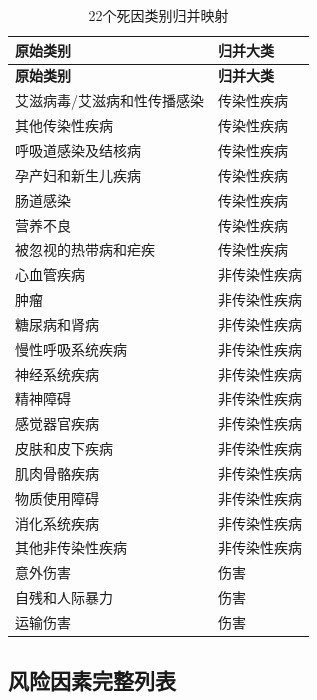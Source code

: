 \documentclass[12pt,a4paper]{ctexart}
\begin{document}
\begin{longtable}{p{8cm}l}
\caption{22个死因类别归并映射} \label{tab:full-cause-map} \\
\toprule
\textbf{原始类别} & \textbf{归并大类} \\
\midrule
\endfirsthead
\toprule
\textbf{原始类别} & \textbf{归并大类} \\
\midrule
\endhead
\midrule
\endfoot
\bottomrule
\endlastfoot
艾滋病毒/艾滋病和性传播感染 & 传染性疾病 \\
其他传染性疾病 & 传染性疾病 \\
呼吸道感染及结核病 & 传染性疾病 \\
孕产妇和新生儿疾病 & 传染性疾病 \\
肠道感染 & 传染性疾病 \\
营养不良 & 传染性疾病 \\
被忽视的热带病和疟疾 & 传染性疾病 \\
心血管疾病 & 非传染性疾病 \\
肿瘤 & 非传染性疾病 \\
糖尿病和肾病 & 非传染性疾病 \\
慢性呼吸系统疾病 & 非传染性疾病 \\
神经系统疾病 & 非传染性疾病 \\
精神障碍 & 非传染性疾病 \\
感觉器官疾病 & 非传染性疾病 \\
皮肤和皮下疾病 & 非传染性疾病 \\
肌肉骨骼疾病 & 非传染性疾病 \\
物质使用障碍 & 非传染性疾病 \\
消化系统疾病 & 非传染性疾病 \\
其他非传染性疾病 & 非传染性疾病 \\
意外伤害 & 伤害 \\
自残和人际暴力 & 伤害 \\
运输伤害 & 伤害 \\
\end{longtable}

\subsection{风险因素完整列表}
\end{document}
